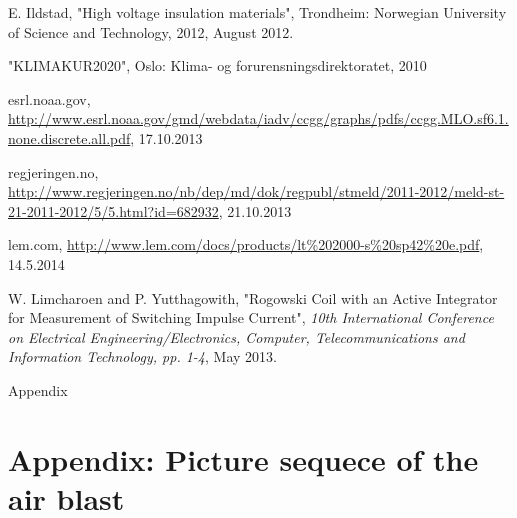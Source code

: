 \documentclass[10pt,b5paper,twoside]{article}
\begin{document}
\begin{thebibliography}{10}
 E. Ildstad, "High voltage insulation materials", Trondheim: Norwegian University of Science and Technology, 2012, August 2012.

 "KLIMAKUR2020", Oslo: Klima- og forurensningsdirektoratet, 2010

 esrl.noaa.gov, \url{http://www.esrl.noaa.gov/gmd/webdata/iadv/ccgg/graphs/pdfs/ccgg.MLO.sf6.1.none.discrete.all.pdf}, 17.10.2013

 regjeringen.no, \url{http://www.regjeringen.no/nb/dep/md/dok/regpubl/stmeld/2011-2012/meld-st-21-2011-2012/5/5.html?id=682932}, 21.10.2013


 lem.com, \url{http://www.lem.com/docs/products/lt\%202000-s\%20sp42\%20e.pdf}, 14.5.2014

 W. Limcharoen and P. Yutthagowith, "Rogowski Coil with an Active Integrator for Measurement of Switching Impulse Current", \textit{10th International Conference on Electrical Engineering/Electronics, Computer, Telecommunications and Information Technology, pp. 1-4}, May 2013.

\end{thebibliography}

\cleardoublepage
\appendix
\vspace*{\fill}
\begingroup
\begin{center}
\huge Appendix
\end{center}
\endgroup
\vspace*{\fill}

\cleardoublepage

\section{Appendix: Picture sequece of the air blast} \label{app:SelfBlast}
\setcounter{figure}{0}
\makeatletter 
\renewcommand{\thefigure}{A.\@arabic\c@figure}
\makeatother
\end{document}

